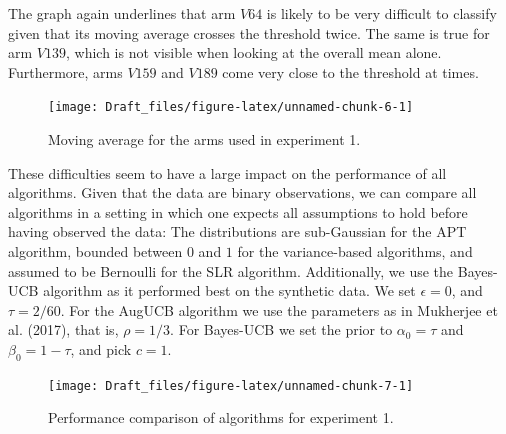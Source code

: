 \documentclass[11pt,]{article}
\begin{document}
The graph again underlines that arm \(V64\) is likely to be very
difficult to classify given that its moving average crosses the
threshold twice. The same is true for arm \(V139\), which is not visible
when looking at the overall mean alone. Furthermore, arms \(V159\) and
\(V189\) come very close to the threshold at times.

\begin{figure}

{\centering \texttt{[image: Draft\_files/figure-latex/unnamed-chunk-6-1]} 

}

\caption{Moving average for the arms used in experiment 1.}\label{fig:unnamed-chunk-6}
\end{figure}

These difficulties seem to have a large impact on the performance of all
algorithms. Given that the data are binary observations, we can compare
all algorithms in a setting in which one expects all assumptions to hold
before having observed the data: The distributions are sub-Gaussian for
the APT algorithm, bounded between \(0\) and \(1\) for the
variance-based algorithms, and assumed to be Bernoulli for the SLR
algorithm. Additionally, we use the Bayes-UCB algorithm as it performed
best on the synthetic data. We set \(\epsilon = 0\), and
\(\tau = 2/60\). For the AugUCB algorithm we use the parameters as in
Mukherjee et al. (2017), that is, \(\rho = 1/3\). For Bayes-UCB we set
the prior to \(\alpha_0 = \tau\) and \(\beta_0 = 1-\tau\), and pick
\(c=1\).

\begin{figure}

{\centering \texttt{[image: Draft\_files/figure-latex/unnamed-chunk-7-1]} 

}

\caption{Performance comparison of algorithms for experiment 1.}\label{fig:unnamed-chunk-7}
\end{figure}
\end{document}
